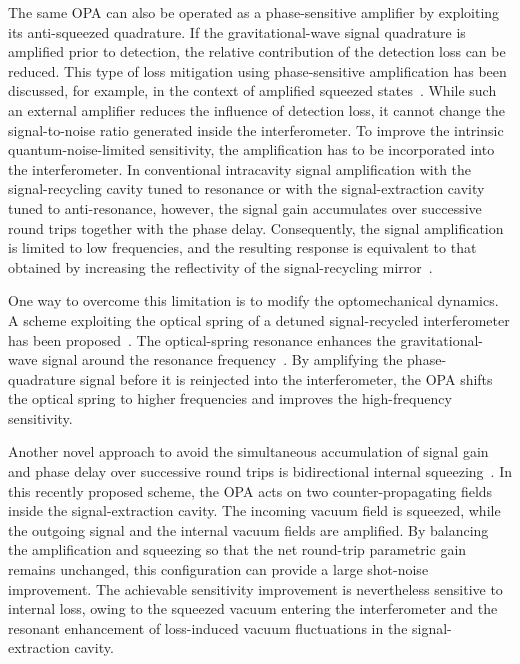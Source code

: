\documentclass{iopjournal}
\begin{document}
The same OPA can also be operated as a phase-sensitive amplifier by exploiting its anti-squeezed quadrature.
If the gravitational-wave signal quadrature is amplified  prior to detection, the relative contribution of the detection loss can be reduced. 
This type of loss mitigation using phase-sensitive amplification has been discussed, for example, in the context of amplified squeezed states~\cite{Kwan2024AmplifiedSqueezedStates}. 
While such an external amplifier reduces the influence of detection loss, it cannot change the signal-to-noise ratio generated inside the interferometer. 
To improve the intrinsic quantum-noise-limited sensitivity, the amplification has to be incorporated into the interferometer.
In conventional intracavity signal amplification with the signal-recycling cavity tuned to resonance or with the signal-extraction cavity tuned to anti-resonance, however, the signal gain accumulates over successive round trips together with the phase delay. Consequently, the signal amplification is limited to low frequencies, and the resulting response is equivalent to that obtained by increasing the reflectivity of the signal-recycling mirror~\cite{Somiya2012}.

One way to overcome this limitation is to modify the optomechanical dynamics. A scheme exploiting the optical spring of a detuned signal-recycled interferometer has been proposed~\cite{Somiya2016ParametricSignalAmplification,Somiya2023IntracavitySignalAmplification}. The optical-spring resonance enhances the gravitational-wave signal around the resonance frequency~\cite{Buonanno2001SignalRecycled,Suzuki2025OpticalSpringSRMI}. By amplifying the phase-quadrature signal before it is reinjected into the interferometer, the OPA shifts the optical spring to higher frequencies and improves the high-frequency sensitivity. 

Another novel approach to avoid the simultaneous accumulation of signal gain and phase delay over successive round trips is bidirectional internal squeezing~\cite{Vermeulen2026BidirectionalInternalSqueezing}. 
In this recently proposed scheme, the OPA acts on two counter-propagating fields inside
the signal-extraction cavity. 
The incoming vacuum field is squeezed, while the outgoing signal and the internal vacuum fields are amplified. By balancing the amplification and squeezing so that the net round-trip parametric gain remains unchanged,  this configuration can provide a large shot-noise improvement. 
The achievable sensitivity improvement is nevertheless sensitive to internal loss, owing to the squeezed vacuum entering the interferometer and the resonant enhancement of loss-induced vacuum fluctuations in the signal-extraction cavity.
\end{document}
